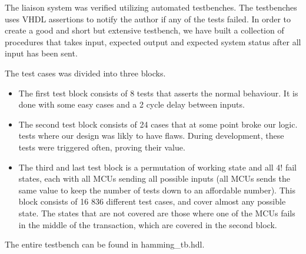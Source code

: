 The liaison system was verified utilizing automated testbenches. The testbenches uses VHDL assertions to notify the author if any
of the tests failed. In order to create a good and short but extensive testbench, we have built a collection of procedures that takes input, expected output
and expected system status after all input has been sent.

The test cases was divided into three blocks.
\begin{itemize}
\item The first test block consists of 8 tests that asserts the normal behaviour. It is done with some easy cases and a 2 cycle delay between inputs.

\item The second test block consists of 24 cases that at some point broke our logic.  tests where our design was likly to have flaws. During development, these tests were
triggered often, proving their value.

\item The third and last test block is a permutation of working state and all 4! fail states, each with all MCUs sending
all possible inputs (all MCUs sends the same value to keep the number of tests down to an affordable number). This block consists of 16 836 different test cases,
and cover almost any possible state. The states that are not covered are those where one of the MCUs fails in the middle of the transaction, which are covered in
the second block.
\end{itemize}

The entire testbench can be found in {\ttfamily hamming\_tb.hdl}.
